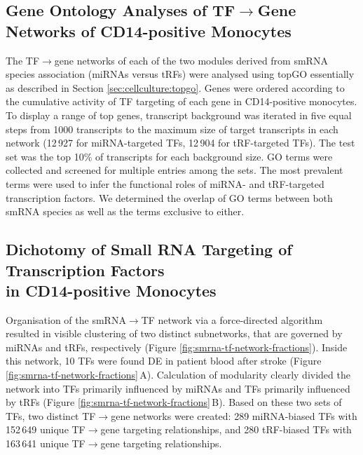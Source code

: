 \begin{method}
\subsection[Gene Ontology Analyses of TF$\to$Gene Networks\texorpdfstring{\\}{} of CD14-positive Monocytes]{Gene Ontology Analyses of TF$\to$Gene Networks of CD14-positive Monocytes} \label{sec:stroke:go-cd14}
The TF$\to$gene networks of each of the two modules derived from smRNA species association (miRNAs versus tRFs) were analysed using topGO\cite{Alexa2006} essentially as described in Section \ref{sec:cellculture:topgo}. Genes were ordered according to the cumulative activity of TF targeting of each gene in CD14-positive monocytes. To display a range of top genes, transcript background was iterated in five equal steps from 1000 transcripts to the maximum size of target transcripts in each network (12\,927 for miRNA-targeted TFs, 12\,904 for tRF-targeted TFs). The test set was the top 10\% of transcripts for each background size. GO terms were collected and screened for multiple entries among the sets. The most prevalent terms were used to infer the functional roles of miRNA- and tRF-targeted transcription factors. We determined the overlap of GO terms between both smRNA species as well as the terms exclusive to either. 

\end{method}

\subsection{Dichotomy of Small RNA Targeting of Transcription Factors\\ in CD14-positive Monocytes}
Organisation of the smRNA$\to$TF network via a force-directed algorithm resulted in visible clustering of two distinct subnetworks, that are governed by miRNAs and tRFs, respectively (Figure \ref{fig:smrna-tf-network-fractions}). Inside this network, 10 TFs were found DE in patient blood after stroke (Figure \ref{fig:smrna-tf-network-fractions}\,A). Calculation of modularity clearly divided the network into TFs primarily influenced by miRNAs and TFs primarily influenced by tRFs (Figure \ref{fig:smrna-tf-network-fractions}\,B). Based on these two sets of TFs, two distinct TF$\to$gene networks were created: 289 miRNA-biased TFs with 152\,649 unique TF$\to$gene targeting relationships, and 280 tRF-biased TFs with 163\,641 unique TF$\to$gene targeting relationships.

